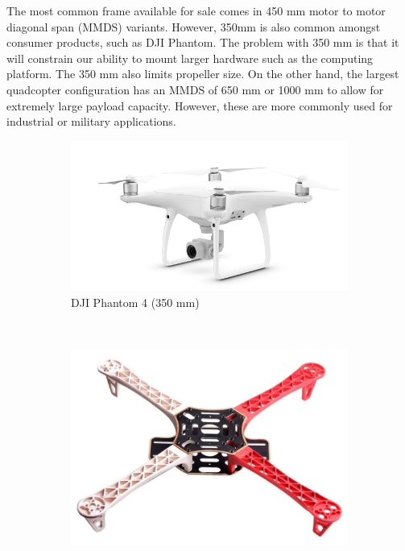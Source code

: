 The most common frame available for sale comes in 450 mm motor to motor diagonal span (MMDS) variants. However, 
350mm is also common amongst consumer products, such as DJI Phantom. The problem with 350 mm is that it will 
constrain our ability to mount larger hardware such as the computing platform. The 350 mm also limits 
propeller size. On the other hand, the largest quadcopter configuration has an MMDS of 650 mm or 1000 mm 
to allow for extremely large payload capacity. However, these are more commonly used for industrial or military 
applications.

\begin{figure}[H]
    \centering
    \begin{subfigure}[b]{0.33\textwidth}
        \centering
        \includegraphics[width=\textwidth]{img/djiphantom4}
        \caption{DJI Phantom 4 (350 mm)}
    \end{subfigure}
    ~
    \begin{subfigure}[b]{0.33\textwidth}
        \centering
        \includegraphics[width=\textwidth]{img/f450frame}

\end{subfigure}
\end{figure}
